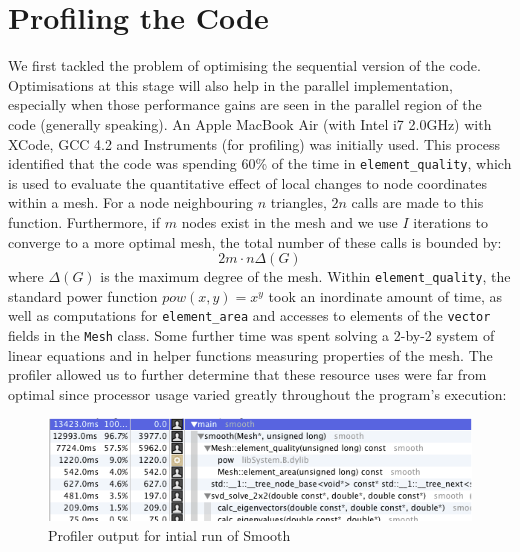 \documentclass[a4paper,11pt, twocolumn]{article}
\newenvironment{changemargin}[2]{\begin{list}{}{%
\setlength{\topsep}{0pt}%
\setlength{\leftmargin}{0pt}%
\setlength{\rightmargin}{0pt}%
\setlength{\listparindent}{\parindent}%
\setlength{\itemindent}{\parindent}%
\setlength{\parsep}{0pt plus 1pt}%
\addtolength{\leftmargin}{#1}%
\addtolength{\rightmargin}{#2}%
}\item }{\end{list}}
\begin{document}
\section{Profiling the Code}
We first tackled the problem of optimising the sequential version of the code.
Optimisations at this stage will also help in the parallel implementation, especially when those performance gains are seen in the parallel region of the code (generally speaking).
An Apple MacBook Air (with Intel i7 2.0GHz) with XCode, GCC 4.2 and Instruments (for profiling) was initially used.
This process identified that the code was spending 60\% of the time in \verb+element_quality+, which is used to evaluate the quantitative effect of local changes to node coordinates within a mesh.
For a node neighbouring $n$ triangles, $2n$ calls are made to this function.
Furthermore, if $m$ nodes exist in the mesh and we use $I$ iterations to converge to a more optimal mesh, the total number of these calls is bounded by:
$$
2m\cdot n\Delta(G)
$$
where $\Delta(G)$ is the maximum degree of the mesh.
Within \verb+element_quality+, the standard power function $pow(x, y) = x^y$ took an inordinate amount of time, as well as computations for \verb+element_area+ and accesses to elements of the \verb+vector+ fields in the \verb+Mesh+ class.
Some further time was spent solving a 2-by-2 system of linear equations and in helper functions measuring properties of the mesh.
The profiler allowed us to further determine that these resource uses were far from optimal since processor usage varied greatly throughout the program's execution:
\begin{figure}[!h]
\begin{changemargin}{-20mm}{-20mm}
\center
\includegraphics[scale=0.4]{profile.png}
\caption{Profiler output for intial run of Smooth}
\end{changemargin}
\end{figure}
\end{document}
